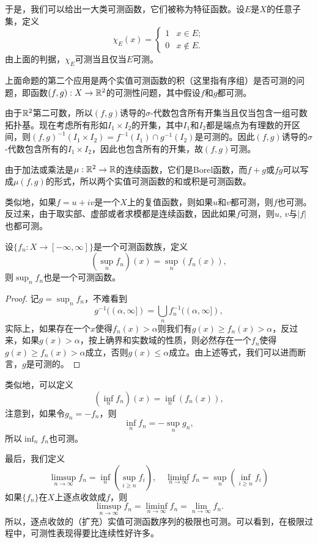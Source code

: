 于是，我们可以给出一大类可测函数，它们被称为特征函数。设$E$是$X$的任意子集，定义
\[
	\chi_E(x)=\begin{cases}
	1&x\in E;\\
	0&x\not\in E.
	\end{cases}
\]
由上面的判据，$\chi_E$可测当且仅当$E$可测。

上面命题的第二个应用是两个实值可测函数的积（这里指有序组）是否可测的问题，即函数$(f,g):X\to \mathbb{R}^2$的可测性问题，其中假设$f$和$g$都可测。

由于$\mathbb{R}^2$第二可数，所以$(f,g)$诱导的$\sigma$-代数包含所有开集当且仅当包含一组可数拓扑基。现在考虑所有形如$I_1\times I_2$的开集，其中$I_1$和$I_2$都是端点为有理数的开区间，则$(f,g)^{-1}(I_1\times I_2)=f^{-1}(I_1)\cap g^{-1}(I_2)$是可测的。因此$(f,g)$诱导的$\sigma$-代数包含所有的$I_1\times I_2$，因此也包含所有的开集，故$(f,g)$可测。

由于加法或乘法是$\mu:\mathbb{R}^2\to \mathbb{R}$的连续函数，它们是Borel函数，而$f+g$或$fg$可以写成$\mu(f,g)$的形式，所以两个实值可测函数的和或积是可测函数。

类似地，如果$f=u+i v$是一个$X$上的复值函数，则如果$u$和$v$都可测，则$f$也可测。反过来，由于取实部、虚部或者求模都是连续函数，因此如果$f$可测，则$u$, $v$与$|f|$也都可测。

\begin{pro}
设$\{f_n:X\to [-\infty,\infty]\}$是一个可测函数族，定义
\[
	\left(\sup_n f_n\right)(x)=\sup_n (f_n(x)),
\]
则$\sup_n f_n$也是一个可测函数。
\end{pro}

\begin{proof}
记$g=\sup_n f_n$，不难看到
\[
	g^{-1}((\alpha,\infty])=\bigcup_n f_n^{-1}((\alpha,\infty]),
\]
实际上，如果存在一个$x$使得$f_n(x)>\alpha$则我们有$g(x)\geq f_n(x)>\alpha$，反过来，如果$g(x)>\alpha$，按上确界和实数域的性质，则必然存在一个$f_n$使得$g(x)\geq f_n(x)>\alpha$成立，否则$g(x)\leq \alpha$成立。由上述等式，我们可以进而断言，$g$是可测的。
\end{proof}

类似地，可以定义
\[
	\left(\inf_n f_n\right)(x)=\inf_n (f_n(x)),
\]
注意到，如果令$g_n=-f_n$，则
\[
	\inf_n f_n=-\sup_n g_n,
\]
所以$\inf_n f_n$也可测。

最后，我们定义
\[
	\limsup_{n\to \infty}f_n=\inf_n \left(\sup_{i\geq n}f_i\right),\quad \liminf_{n\to \infty}f_n=\sup_n \left(\inf_{i\geq n}f_i\right)
\]
如果$\{f_n\}$在$X$上逐点收敛成$f$，则
\[
	\limsup_{n\to \infty}f_n= \liminf_{n\to \infty}f_n=\lim_{n\to\infty}f_n.
\]
所以，逐点收敛的（扩充）实值可测函数序列的极限也可测。可以看到，在极限过程中，可测性表现得要比连续性好许多。


